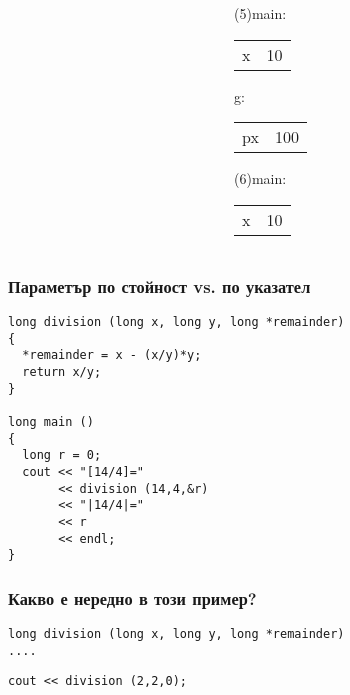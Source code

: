 \documentclass{beamer}
\begin{document}
\begin{frame}[fragile]
\begin{columns}[t]
\begin{column}{0.3\textwidth}
  \end{column}
  \begin{column}{0.3\textwidth}

\pause

  (5)main:

  \begin{tabular}{c|c}
  x & \alert{10} 
  \end{tabular}

  g:

  \begin{tabular}{c|c}
  px & 100 
  \end{tabular}

\vspace{10px}
\pause

  (6)main:

  \begin{tabular}{c|c}
  x & 10
  \end{tabular}


  \end{column}


\end{columns}




\end{frame}

\begin{frame}[fragile]
\frametitle{Параметър по стойност vs. по указател}

\begin{flushleft}
\begin{lstlisting}
long division (long x, long y, long *remainder)
{
  *remainder = x - (x/y)*y;
  return x/y;
}

long main ()
{
  long r = 0;
  cout << "[14/4]=" 
       << division (14,4,&r)
       << "|14/4|="
       << r
       << endl;
}
\end{lstlisting}
\end{flushleft}

\end{frame}


\begin{frame}[fragile]
\frametitle{Какво е нередно в този пример?}

\begin{flushleft}
\begin{lstlisting}
long division (long x, long y, long *remainder)
....
\end{lstlisting}
\end{flushleft}


\begin{center}
\begin{lstlisting}
cout << division (2,2,0);
\end{lstlisting}
\end{center}


\end{frame}
\end{document}
